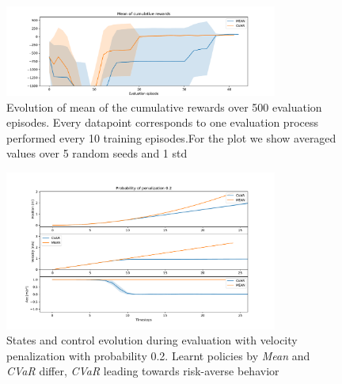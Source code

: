 \begin{figure}[ht]
        \centering
        \includegraphics[width=0.8\textwidth]{images/Car/CVAR/mean_train_withstds.pdf}
        \caption{Evolution of mean of the cumulative rewards over 500 evaluation episodes.
        Every datapoint corresponds
        to one evaluation process performed every 10 training episodes.For the plot we
        show averaged values over 5 random seeds and 1 std}
        \label{mean_car}
    
\end{figure}

\begin{figure}[ht]
        \centering
        \includegraphics[width=0.8\textwidth]{images/Car/CVAR/Trajectory_withstds_penal.pdf}
        \caption{States and control evolution during evaluation with velocity penalization
        with probability 0.2.
        Learnt policies by \textit{Mean} and \textit{CVaR} differ, \textit{CVaR} leading
        towards risk-averse behavior}
        \label{traj_probpenal0.2}
    
\end{figure}


